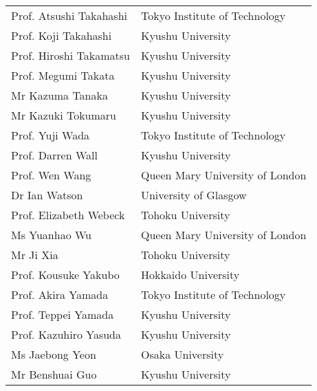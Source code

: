 \begin{longtable}{ll}
Prof. Atsushi Takahashi & Tokyo Institute of Technology \\
Prof. Koji Takahashi & Kyushu University \\
Prof. Hiroshi Takamatsu & Kyushu University \\
Prof. Megumi Takata & Kyushu University \\
Mr  Kazuma Tanaka & Kyushu University \\
Mr  Kazuki Tokumaru & Kyushu University \\
Prof. Yuji Wada & Tokyo Institute of Technology \\
Prof. Darren Wall & Kyushu University \\
Prof. Wen Wang & Queen Mary University of London \\
Dr Ian Watson & University of Glasgow \\
Prof. Elizabeth Webeck & Tohoku University \\
Ms  Yuanhao Wu & Queen Mary University of London \\
Mr  Ji Xia & Tohoku University \\
Prof. Kousuke Yakubo & Hokkaido University \\
Prof. Akira Yamada & Tokyo Institute of Technology \\
Prof. Teppei Yamada & Kyushu University \\
Prof. Kazuhiro Yasuda & Kyushu University \\
Ms  Jaebong Yeon & Osaka University \\
Mr Benshuai Guo & Kyushu University \\

\end{longtable}

